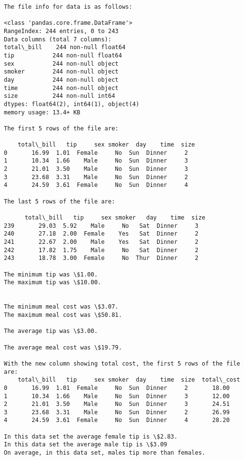 \documentclass[11pt]{article}
\begin{document}
    \begin{Verbatim}[commandchars=\\\{\}]
The file info for data is as follows: 

<class 'pandas.core.frame.DataFrame'>
RangeIndex: 244 entries, 0 to 243
Data columns (total 7 columns):
total\_bill    244 non-null float64
tip           244 non-null float64
sex           244 non-null object
smoker        244 non-null object
day           244 non-null object
time          244 non-null object
size          244 non-null int64
dtypes: float64(2), int64(1), object(4)
memory usage: 13.4+ KB

The first 5 rows of the file are: 

    total\_bill   tip     sex smoker  day    time  size
0       16.99  1.01  Female     No  Sun  Dinner     2
1       10.34  1.66    Male     No  Sun  Dinner     3
2       21.01  3.50    Male     No  Sun  Dinner     3
3       23.68  3.31    Male     No  Sun  Dinner     2
4       24.59  3.61  Female     No  Sun  Dinner     4

The last 5 rows of the file are: 

      total\_bill   tip     sex smoker   day    time  size
239       29.03  5.92    Male     No   Sat  Dinner     3
240       27.18  2.00  Female    Yes   Sat  Dinner     2
241       22.67  2.00    Male    Yes   Sat  Dinner     2
242       17.82  1.75    Male     No   Sat  Dinner     2
243       18.78  3.00  Female     No  Thur  Dinner     2

The minimum tip was \$1.00.
The maximum tip was \$10.00.


The minimum meal cost was \$3.07.
The maximum meal cost was \$50.81.

The average tip was \$3.00.

The average meal cost was \$19.79.

With the new column showing total cost, the first 5 rows of the file are: 
    total\_bill   tip     sex smoker  day    time  size  total\_cost
0       16.99  1.01  Female     No  Sun  Dinner     2       18.00
1       10.34  1.66    Male     No  Sun  Dinner     3       12.00
2       21.01  3.50    Male     No  Sun  Dinner     3       24.51
3       23.68  3.31    Male     No  Sun  Dinner     2       26.99
4       24.59  3.61  Female     No  Sun  Dinner     4       28.20

In this data set the average female tip is \$2.83.
In this data set the average male tip is \$3.09
On average, in this data set, males tip more than females.

    \end{Verbatim}
\end{document}
